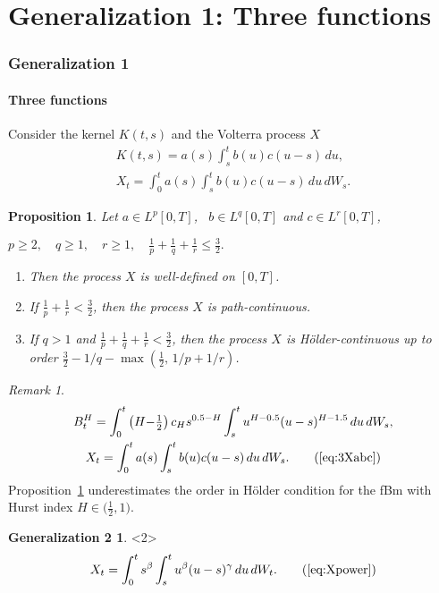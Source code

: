 \documentclass{beamer}
\theoremstyle{plain}
\newtheorem{proposition}{Proposition}
\theoremstyle{definition}
\newtheorem{Gen2}{Generalization 2}
\theoremstyle{remark}
\newtheorem{remark}{Remark}
\begin{document}
\section{Generalization 1: Three functions}
\begin{frame}
	\frametitle{Generalization 1}
	\framesubtitle{Three functions}
	Consider the kernel $K(t,s)$ and the Volterra process $X$
\begin{gather}
K(t,s) = a(s) \int_s^t b(u) c(u-s) \, du,
\\
\label{eq:3Xabc}
X_t = \int_0^t a(s) \int_s^t b(u) c(u-s)\, du \, dW_s .
\end{gather}
\begin{proposition}\label{prop:1}
Let $a\in L^p[0,T]$, \, $b\in L^q[0,T]$
and $c\in L^r[0,T]$,
\addtocounter{equation}{1}
	\centerline{$\displaystyle
p\ge 2,\quad
q\ge 1,\quad
r\ge 1,\quad
\frac{1}{p}+\frac{1}{q}+\frac{1}{r}\le \frac32.
	$}\llap{(\theequation)}
	\begin{enumerate}
		\item
Then the process $X$ is well-defined on $[0,T]$.
\item
If $\frac{1}{p}+\frac{1}{r} < \frac32$,
then the process $X$ is  path-continuous.
\item
If $q>1$ and $\frac{1}{p}+\frac{1}{q}+\frac{1}{r} < \frac32$,
then the process $X$ is H\"older-continuous up
to order $\frac32 - 1/q - \max(\frac12, \, 1/p+1/r)$.
	\end{enumerate}
\end{proposition}
\end{frame}

\begin{frame}
\begin{remark}
	\begin{gather}
	B^H_t = 
\int_0^t \left(H{-}{\textstyle\frac12}\right) c_H
s^{0.5-H} \int_s^t u^{H-0.5} (u-s)^{H-1.5} \, du \, dW_s,
		\nonumber\\
X_t = \int_0^t a(s) \int_s^t b(u) c(u-s)\, du \, dW_s .
		\tag{\ref{eq:3Xabc}}	
	\end{gather}
Proposition~\ref{prop:1}
underestimates the order in H\"older condition for the fBm
with Hurst index $H\in\bigl(\frac12,1\bigr)$.
\end{remark}
\begin{Gen2}<2>
\begin{equation}
X_t = \int_0^t s^\beta \int_s^t u^\beta (u-s)^\gamma \,  du \, dW_t.
\tag{\ref{eq:Xpower}}
\end{equation}
\end{Gen2}
\end{frame}
\end{document}
